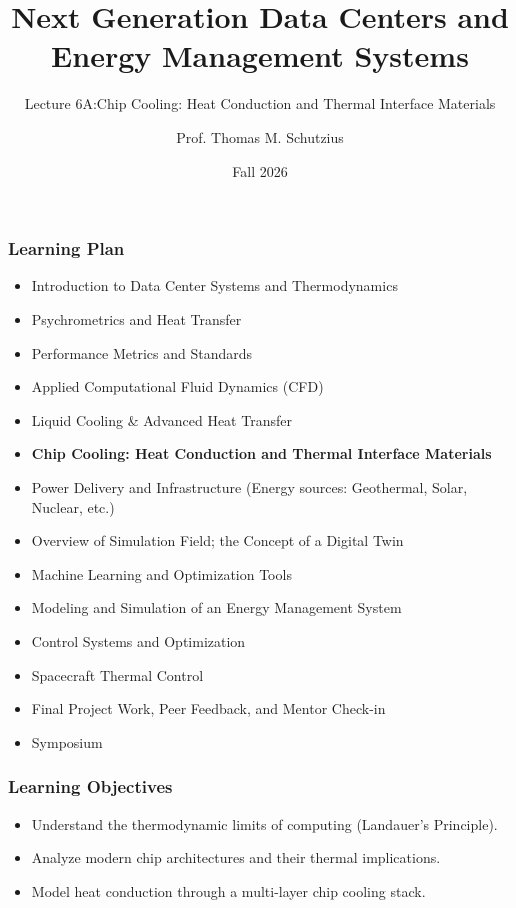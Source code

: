 \documentclass[aspectratio=169,10pt,xcolor={table,dvipsnames},t]{beamer}
\title[lecture 06]{Next Generation Data Centers and Energy Management Systems}
\subtitle{Lecture 6A:Chip Cooling: Heat Conduction and Thermal Interface Materials}
\author{Prof. Thomas M. Schutzius}
\institute{Department of Mechanical Engineering}
\date{Fall 2026}
\begin{document}
\begin{frame}
  \titlepage
\end{frame}


{
\smallframetitle %

\begin{frame}
	\frametitle{Learning Plan}
	\begin{itemize}
		\item Introduction to Data Center Systems and Thermodynamics 
		\item Psychrometrics and Heat Transfer
		\item Performance Metrics and Standards
		\item Applied Computational Fluid Dynamics (CFD)
		\item Liquid Cooling \& Advanced Heat Transfer
		\item \textbf{Chip Cooling: Heat Conduction and Thermal Interface Materials}
		\item Power Delivery and Infrastructure (Energy sources: Geothermal, Solar, Nuclear, etc.)
		\item Overview of Simulation Field; the Concept of a Digital Twin 
		\item Machine Learning and Optimization Tools 
		\item Modeling and Simulation of an Energy Management System 
		\item Control Systems and Optimization 
		\item Spacecraft Thermal Control
		\item Final Project Work, Peer Feedback, and Mentor Check-in 
		\item Symposium 
	\end{itemize}		
\end{frame}

\begin{frame}
	\frametitle{Learning Objectives} 
		\begin{itemize}
			\item Understand the thermodynamic limits of computing (Landauer's Principle).
			\item Analyze modern chip architectures and their thermal implications.
			\item Model heat conduction through a multi-layer chip cooling stack.
		\end{itemize}		
\end{frame}


}
\end{document}
